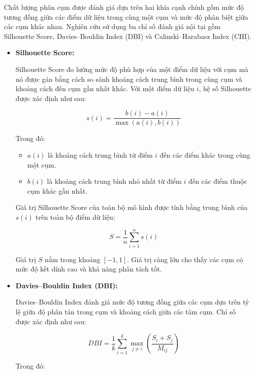 \documentclass[12pt]{ai_conquer2026}
\begin{document}
Chất lượng phân cụm được đánh giá dựa trên hai khía cạnh chính gồm mức độ tương đồng giữa các điểm dữ liệu trong cùng một cụm và mức độ phân biệt giữa các cụm khác nhau. Nghiên cứu sử dụng ba chỉ số đánh giá nội tại gồm Silhouette Score, Davies--Bouldin Index (DBI) và Calinski--Harabasz Index (CHI).

\begin{itemize}

\item \textbf{Silhouette Score:}

Silhouette Score đo lường mức độ phù hợp của một điểm dữ liệu với cụm mà nó được gán bằng cách so sánh khoảng cách trung bình trong cùng cụm và khoảng cách đến cụm gần nhất khác. Với một điểm dữ liệu $i$, hệ số Silhouette được xác định như sau:

\begin{equation}
s(i)=\frac{b(i)-a(i)}
{\max(a(i),b(i))}
\end{equation}

Trong đó:

\begin{itemize}
    \item $a(i)$ là khoảng cách trung bình từ điểm $i$ đến các điểm khác trong cùng một cụm.
    \item $b(i)$ là khoảng cách trung bình nhỏ nhất từ điểm $i$ đến các điểm thuộc cụm khác gần nhất.
\end{itemize}

Giá trị Silhouette Score của toàn bộ mô hình được tính bằng trung bình của $s(i)$ trên toàn bộ điểm dữ liệu:

\begin{equation}
S=\frac{1}{n}\sum_{i=1}^{n}s(i)
\end{equation}

Giá trị $S$ nằm trong khoảng $[-1,1]$. Giá trị càng lớn cho thấy các cụm có mức độ kết dính cao và khả năng phân tách tốt.


\item \textbf{Davies--Bouldin Index (DBI):}

Davies--Bouldin Index đánh giá mức độ tương đồng giữa các cụm dựa trên tỷ lệ giữa độ phân tán trong cụm và khoảng cách giữa các tâm cụm. Chỉ số được xác định như sau:

\begin{equation}
DBI=\frac{1}{k}
\sum_{i=1}^{k}
\max_{j\neq i}
\left(
\frac{S_i+S_j}{M_{ij}}
\right)
\end{equation}

Trong đó:


\end{itemize}
\end{document}

